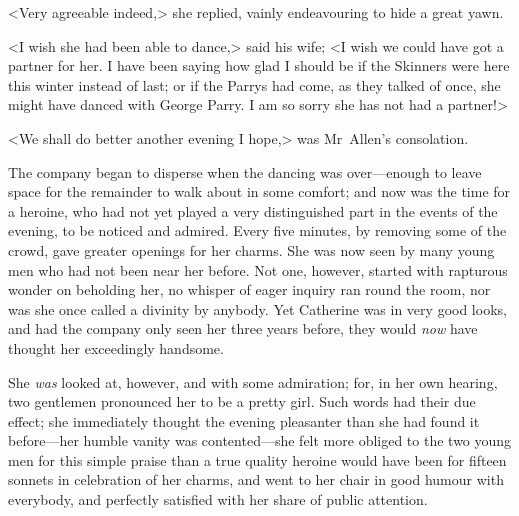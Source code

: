  <Very agreeable indeed,> she replied, vainly endeavouring to hide a great yawn. 

 <I wish she had been able to dance,> said his wife; <I wish we could have got a partner for her. I have been saying how glad I should be if the Skinners were here this winter instead of last; or if the Parrys had come, as they talked of once, she might have danced with George Parry. I am so sorry she has not had a partner!> 

 <We shall do better another evening I hope,> was Mr~Allen's consolation. 

 The company began to disperse when the dancing was over—enough to leave space for the remainder to walk about in some comfort; and now was the time for a heroine, who had not yet played a very distinguished part in the events of the evening, to be noticed and admired. Every five minutes, by removing some of the crowd, gave greater openings for her charms. She was now seen by many young men who had not been near her before. Not one, however, started with rapturous wonder on beholding her, no whisper of eager inquiry ran round the room, nor was she once called a divinity by anybody. Yet Catherine was in very good looks, and had the company only seen her three years before, they would \textit{now} have thought her exceedingly handsome. 

 She \textit{was} looked at, however, and with some admiration; for, in her own hearing, two gentlemen pronounced her to be a pretty girl. Such words had their due effect; she immediately thought the evening pleasanter than she had found it before—her humble vanity was contented—she felt more obliged to the two young men for this simple praise than a true quality heroine would have been for fifteen sonnets in celebration of her charms, and went to her chair in good humour with everybody, and perfectly satisfied with her share of public attention. 